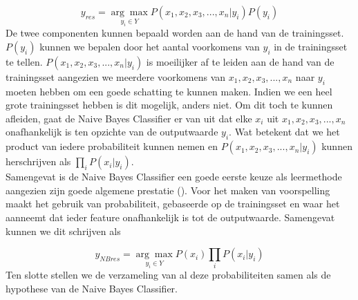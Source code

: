  \[ y_{res} = \underset{y_i \in Y}{\arg\max}P(x_{1},x_{2},x_{3},...,x_{n}|y_i)P(y_i) \]
%
 De twee componenten kunnen bepaald worden aan de hand van de trainingsset. $P(y_i)$ kunnen we bepalen door het aantal voorkomens van $y_i$ in de trainingsset te tellen. $P(x_{1},x_{2},x_{3},...,x_{n}|y_i)$ is moeilijker af te leiden aan de hand van de trainingsset aangezien we meerdere voorkomens van $x_{1},x_{2},x_{3},...,x_{n}$ naar $y_i$ moeten hebben om een goede schatting te kunnen maken.  Indien we een heel grote trainingsset hebben is dit mogelijk, anders niet. Om dit toch te kunnen afleiden, gaat de Naive Bayes Classifier er van uit dat elke $x_i$ uit $x_{1},x_{2},x_{3},...,x_{n}$ onafhankelijk is ten opzichte van de outputwaarde $y_i$. Wat betekent dat we het product van iedere probabiliteit kunnen nemen en $P(x_{1},x_{2},x_{3},...,x_{n}|y_i)$  kunnen herschrijven als $\prod\limits_{i} P(x_{i}|y_{i})$.\\
%
Samengevat is de Naive Bayes Classifier een goede eerste keuze als leermethode aangezien zijn goede algemene prestatie (\cite{Michie94machinelearning}). Voor het maken van voorspelling maakt het gebruik van probabiliteit, gebaseerde op de trainingsset en waar het aanneemt dat ieder feature onafhankelijk is tot de outputwaarde. Samengevat kunnen we dit schrijven als

 \[y_{NBres} = \underset{y_i \in Y}{\arg\max} P(x_{i})\prod\limits_{i} P(x_{i}|y_{i}) \]
%
Ten slotte stellen we de verzameling van al deze probabiliteiten samen als de hypothese van de Naive Bayes Classifier.

